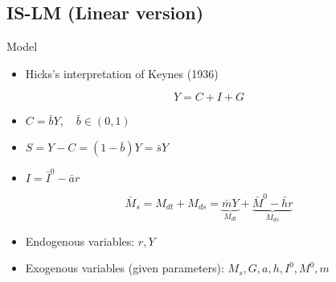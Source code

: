 \documentclass[a4paper,11pt]{article}
\begin{document}
\subsection{IS-LM (Linear version)} %
\label{sub:is_lm_linear_version}
\begin{frame}[t]{Model}
	\begin{itemize}
		\item Hicks's interpretation of Keynes (1936)
	\end{itemize}
	\[
		Y=C+I+G \tag{IS Schedule: Real side}
	\]
	\begin{itemize}
		\item $C=\bar b Y, \quad \bar b \in (0,1)$
		\item $S=Y-C=(1-\bar b ) Y=\bar s Y$
		\item $I=\bar I^0-\bar a r$
	\end{itemize}
	\[
		\bar M_s = M_{dt}+M_{ds} = \underbrace{\bar m Y}_{M_{dt}} + \underbrace{\bar M^0 - \bar h r}_{M_{ds}} \tag{LM Schedule: Monetary side}
	\]
	\begin{itemize}
		\item Endogenous variables: $r,Y$
		\item Exogenous variables (given parameters): $M_s, G, a, h, I^0, M^0, m$
	\end{itemize}
\end{frame}
	
\end{document}
